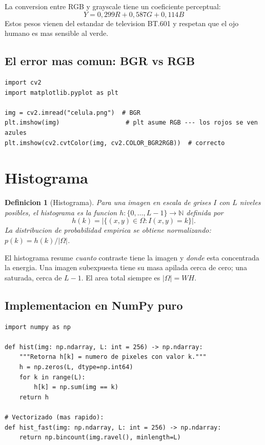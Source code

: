 \documentclass[11pt,a4paper,twoside,openright]{book}
\newtheorem{definicion}{Definicion}[chapter]
\begin{document}
La conversion entre RGB y grayscale tiene un coeficiente perceptual:
\begin{equation}
Y = 0{,}299 R + 0{,}587 G + 0{,}114 B
\label{eq:rgb-gray}
\end{equation}
Estos pesos vienen del estandar de television BT.601 y respetan que el ojo humano es mas sensible al verde.

\subsection{El error mas comun: BGR vs RGB}

\begin{lstlisting}[caption={Trampa clasica de OpenCV.}]
import cv2
import matplotlib.pyplot as plt

img = cv2.imread("celula.png")  # BGR
plt.imshow(img)                  # plt asume RGB --- los rojos se ven azules
plt.imshow(cv2.cvtColor(img, cv2.COLOR_BGR2RGB))  # correcto
\end{lstlisting}

\section{Histograma}

\begin{definicion}[Histograma]
Para una imagen en escala de grises $I$ con $L$ niveles posibles, el \emph{histograma} es la funcion $h: \{0,\dots,L{-}1\} \to \mathbb{N}$ definida por
\begin{equation}
h(k) = |\{(x,y) \in \Omega : I(x,y) = k\}|.
\end{equation}
La \emph{distribucion de probabilidad empirica} se obtiene normalizando: $p(k) = h(k) / |\Omega|$.
\end{definicion}

El histograma resume \emph{cuanto} contraste tiene la imagen y \emph{donde} esta concentrada la energia. Una imagen subexpuesta tiene su masa apilada cerca de cero; una saturada, cerca de $L{-}1$. El area total siempre es $|\Omega| = WH$.

\subsection{Implementacion en NumPy puro}

\begin{lstlisting}[caption={Histograma desde cero.}]
import numpy as np

def hist(img: np.ndarray, L: int = 256) -> np.ndarray:
    """Retorna h[k] = numero de pixeles con valor k."""
    h = np.zeros(L, dtype=np.int64)
    for k in range(L):
        h[k] = np.sum(img == k)
    return h

# Vectorizado (mas rapido):
def hist_fast(img: np.ndarray, L: int = 256) -> np.ndarray:
    return np.bincount(img.ravel(), minlength=L)
\end{lstlisting}
\end{document}
